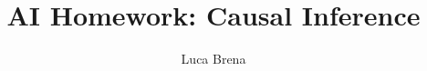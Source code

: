 \documentclass[]{article}
\title{AI Homework: Causal Inference}
\author{Luca Brena}
\begin{document}
\maketitle

\begin{abstract}

\end{abstract}

\section{}
\end{document}
